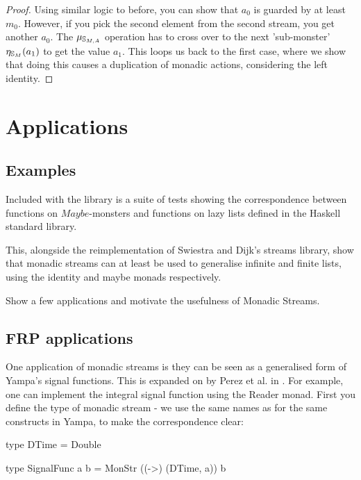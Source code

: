 \documentclass{article}
\begin{document}
\begin{proof}
Using similar logic to before, you can show that $a_0$ is guarded by at least $m_0$. However, if you pick the second element from the second stream, you get another $a_0$. The $\mu_{\mathbb{S}_{M,A}}$ operation has to cross over to the next 'sub-monster' $\eta_{\mathbb{S}_{M}}(a_1)$ to get the value $a_1$. This loops us back to the first case, where we show that doing this causes a duplication of monadic actions, considering the left identity. 

\end{proof}

\section{Applications}

\subsection{Examples}

Included with the library is a suite of tests showing the correspondence between functions on $Maybe$-monsters and functions on lazy lists defined in the Haskell standard library. 

This, alongside the reimplementation of Swiestra and Dijk's streams library, show that monadic streams can at least be used to generalise infinite and finite lists, using the identity and maybe monads respectively.

\begin{ccomment}
	Show a few applications and motivate the usefulness of Monadic Streams.
\end{ccomment}

\subsection{FRP applications}

One application of monadic streams is they can be seen as a generalised form of Yampa's \cite{yampa_arcade} signal functions. This is expanded on by Perez et al. in \cite{frp_refactored}. For example, one can implement the integral signal function using the Reader monad. First you define the type of monadic stream - we use the same names as for the same constructs in Yampa, to make the correspondence clear:

\begin{haskell}
type DTime = Double

type SignalFunc a b = MonStr ((->) (DTime, a)) b
\end{haskell}
\end{document}
